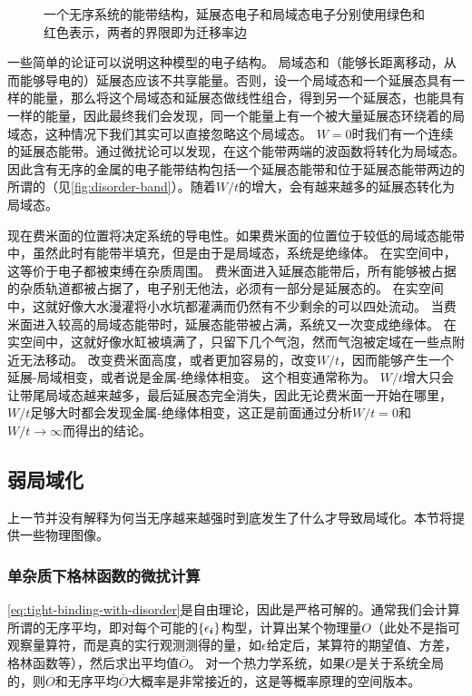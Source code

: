 \begin{figure}
    \centering
    
    \caption{一个无序系统的能带结构，延展态电子和局域态电子分别使用绿色和红色表示，两者的界限即为迁移率边}
    \label{fig:disorder-band}
\end{figure}

一些简单的论证可以说明这种模型的电子结构。
局域态和（能够长距离移动，从而能够导电的）延展态应该不共享能量。否则，设一个局域态和一个延展态具有一样的能量，那么将这个局域态和延展态做线性组合，得到另一个延展态，也能具有一样的能量，因此最终我们会发现，同一个能量上有一个被大量延展态环绕着的局域态，这种情况下我们其实可以直接忽略这个局域态。
$W=0$时我们有一个连续的延展态能带。通过微扰论可以发现，在这个能带两端的波函数将转化为局域态。%
因此含有无序的金属的电子能带结构包括一个延展态能带和位于延展态能带两边的所谓的（见\autoref{fig:disorder-band}）。随着$W/t$的增大，会有越来越多的延展态转化为局域态。

现在费米面的位置将决定系统的导电性。如果费米面的位置位于较低的局域态能带中，虽然此时有能带半填充，但是由于是局域态，系统是绝缘体。
在实空间中，这等价于电子都被束缚在杂质周围。
费米面进入延展态能带后，所有能够被占据的杂质轨道都被占据了，电子别无他法，必须有一部分是延展态的。
在实空间中，这就好像大水漫灌将小水坑都灌满而仍然有不少剩余的可以四处流动。
当费米面进入较高的局域态能带时，延展态能带被占满，系统又一次变成绝缘体。
在实空间中，这就好像水缸被填满了，只留下几个气泡，然而气泡被定域在一些点附近无法移动。
改变费米面高度，或者更加容易的，改变$W/t$，因而能够产生一个延展-局域相变，或者说是金属-绝缘体相变。
这个相变通常称为。
$W/t$增大只会让带尾局域态越来越多，最后延展态完全消失，因此无论费米面一开始在哪里，$W/t$足够大时都会发现金属-绝缘体相变，这正是前面通过分析$W/t=0$和$W/t \to \infty$而得出的结论。

\subsection{弱局域化}

上一节并没有解释为何当无序越来越强时到底发生了什么才导致局域化。本节将提供一些物理图像。

\subsubsection{单杂质下格林函数的微扰计算}

\eqref{eq:tight-binding-with-disorder}是自由理论，因此是严格可解的。通常我们会计算所谓的无序平均，即对每个可能的$\{\epsilon_{\vb*{i}}\}$构型，计算出某个物理量$O$（此处不是指可观察量算符，而是真的实行观测测得的量，如$\epsilon$给定后，某算符的期望值、方差，格林函数等），然后求出平均值$\overline{O}$。
对一个热力学系统，如果$O$是关于系统全局的，则$O$和无序平均$\overline{O}$大概率是非常接近的，这是等概率原理的空间版本。

